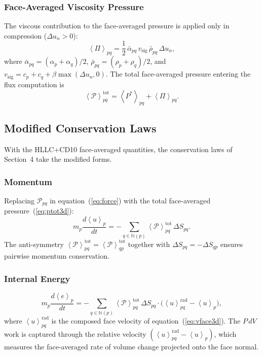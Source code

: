 \documentclass[twocolumn]{aastex63}
\newcommand{\vel}{{u}}
\newcommand{\surf}[0]{S}
\newcommand{\pressure}[0]{\mathcal{P}}
\begin{document}
\subsubsection{Face-Averaged Viscosity Pressure}

The viscous contribution to the face-averaged pressure is
applied only in compression
($\Delta\vel_n > 0$):
\begin{equation}\label{eq:pi3d}
  \left<\Pi\right>_{pq}
  = \frac{1}{2}\,\bar\alpha_{pq}\,
    v_\mathrm{sig}\,
    \bar\rho_{pq}\,\Delta\vel_n,
\end{equation}
where
$\bar\alpha_{pq} = (\alpha_p + \alpha_q)/2$,
$\bar\rho_{pq} = (\rho_p + \rho_q)/2$, and
$v_\mathrm{sig} = c_p + c_q + \beta\max(\Delta\vel_n,0)$.
The total face-averaged pressure entering the flux
computation is
\begin{equation}\label{eq:ptot3d}
  \left<\pressure\right>_{pq}^\textrm{tot}
  = \left<P^*\right>_{pq} + \left<\Pi\right>_{pq}.
\end{equation}


\subsection{Modified Conservation Laws}

With the HLLC+CD10 face-averaged quantities, the
conservation laws of Section~4 take the modified forms.

\subsubsection{Momentum}

Replacing $\pressure_{pq}$ in equation~(\ref{eq:force})
with the total face-averaged pressure~(\ref{eq:ptot3d}):
\begin{equation}\label{eq:mom3d}
  m_p\frac{d\left<\vel\right>_p}{dt}
  = -\sum_{q\in\mathbb{N}(p)}
    \left<\pressure\right>_{pq}^\textrm{tot}
    \,\Delta\surf_{pq}.
\end{equation}
The anti-symmetry
$\left<\pressure\right>_{pq}^\textrm{tot}
 = \left<\pressure\right>_{qp}^\textrm{tot}$
together with $\Delta\surf_{pq} = -\Delta\surf_{qp}$ ensures
pairwise momentum conservation.

\subsubsection{Internal Energy}

\begin{equation}\label{eq:eng3d}
  m_p\frac{d\left<e\right>_p}{dt}
  = -\sum_{q\in\mathbb{N}(p)}
    \left<\pressure\right>_{pq}^\textrm{tot}
    \,\Delta\surf_{pq}\cdot
    \bigl(\left<\vel\right>_{pq}^\textrm{rad}
      - \left<\vel\right>_p\bigr),
\end{equation}
where $\left<\vel\right>_{pq}^\textrm{rad}$ is the composed
face velocity of equation~(\ref{eq:vface3d}).
The $P\,dV$ work is captured through the relative velocity
$(\left<\vel\right>_{pq}^\textrm{rad} - \left<\vel\right>_p)$,
which measures the face-averaged rate of volume change
projected onto the face normal.
\end{document}
